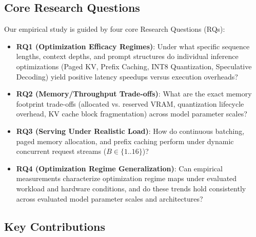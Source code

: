 \subsection{Core Research Questions}
\label{sec:rqs}

Our empirical study is guided by four core Research Questions (RQs):
\begin{itemize}
    \item \textbf{RQ1 (Optimization Efficacy Regimes)}: Under what specific sequence lengths, context depths, and prompt structures do individual inference optimizations (Paged KV, Prefix Caching, INT8 Quantization, Speculative Decoding) yield positive latency speedups versus execution overheads?
    \item \textbf{RQ2 (Memory/Throughput Trade-offs)}: What are the exact memory footprint trade-offs (allocated vs. reserved VRAM, quantization lifecycle overhead, KV cache block fragmentation) across model parameter scales?
    \item \textbf{RQ3 (Serving Under Realistic Load)}: How do continuous batching, paged memory allocation, and prefix caching perform under dynamic concurrent request streams ($B \in \{1..16\}$)?
    \item \textbf{RQ4 (Optimization Regime Generalization)}: Can empirical measurements characterize optimization regime maps under evaluated workload and hardware conditions, and do these trends hold consistently across evaluated model parameter scales and architectures?
\end{itemize}

\subsection{Key Contributions}
\label{sec:contributions}

